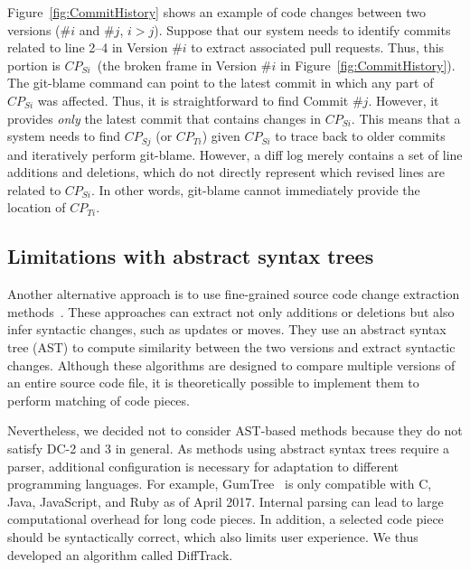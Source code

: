 Figure~\ref{fig:CommitHistory} shows an example of code changes between two versions (\#$i$ and \#$j$, $i > j$).
Suppose that our system needs to identify commits related to line 2--4 in Version \#$i$ to extract associated pull requests.
Thus, this portion is $CP_{Si}$~(the broken frame in Version \#$i$ in Figure~\ref{fig:CommitHistory}).
The git-blame command can point to the latest commit in which any part of $CP_{Si}$ was affected.
Thus, it is straightforward to find Commit \#$j$.
However, it provides \textit{only} the latest commit that contains changes in $CP_{Si}$.
This means that a system needs to find $CP_{Sj}$ (or $CP_{Ti}$) given $CP_{Si}$ to trace back to older commits and iteratively perform git-blame.
However, a diff log merely contains a set of line additions and deletions, which do not directly represent which revised lines are related to $CP_{Si}$.
In other words, git-blame cannot immediately provide the location of $CP_{Ti}$.

\subsection{Limitations with abstract syntax trees}

Another alternative approach is to use fine-grained source code change extraction methods~\cite{GumTree, Change_Distilling}.
These approaches can extract not only additions or deletions but also infer syntactic changes, such as updates or moves.
They use an abstract syntax tree (AST) to compute similarity between the two versions and extract syntactic changes.
Although these algorithms are designed to compare multiple versions of an entire source code file, it is theoretically possible to implement them to perform matching of code pieces.


Nevertheless, we decided not to consider AST-based methods because they do not satisfy DC-2 and 3 in general.
As methods using abstract syntax trees require a parser, additional configuration is necessary for adaptation to different programming languages.
For example, GumTree~\cite{GumTree} is only compatible with C, Java, JavaScript, and Ruby as of April 2017.
Internal parsing can lead to large computational overhead for long code pieces.
In addition, a selected code piece should be syntactically correct, which also limits user experience.
We thus developed an algorithm called DiffTrack.

